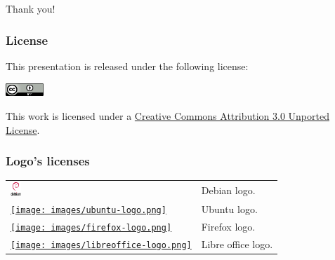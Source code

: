 \documentclass[slidestop,compress,mathserif]{beamer}
\begin{document}
\section{}
\begin{frame}
  \vspace*{\fill}
  \begin{center}
    {\Huge Thank you!}
  \end{center}
  \vspace*{\fill}
\end{frame}

\begin{frame}
  \frametitle{License}
  This presentation is released under the following license:
  
  \begin{block}{}
    \begin{center}
      \includegraphics[height=0.5cm]{images/cc-by.png}
  
      This work is licensed under a \href{http://creativecommons.org/licenses/by/3.0/deed.en_US}{Creative Commons Attribution 3.0 Unported License}.
    \end{center}
  \end{block}
\end{frame}

\begin{frame}
  \frametitle{Logo's licenses}
  \begin{tabularx}{\textwidth}{lX}
    \href{http://www.debian.org/logos/openlogo-100.png}{\includegraphics[height=0.5cm]{images/debian-logo.png}} & Debian logo. \\
    \href{http://design.ubuntu.com/wp-content/uploads/logo-ubuntu_cof-orange-hex.png}{\texttt{[image: images/ubuntu-logo.png]}} & Ubuntu logo. \\
    \href{http://upload.wikimedia.org/wikipedia/commons/e/e7/Mozilla_Firefox_3.5_logo_256.png}{\texttt{[image: images/firefox-logo.png]}} & Firefox logo. \\
    \href{http://upload.wikimedia.org/wikipedia/commons/thumb/c/cb/LibreOfficelogo.svg/200px-LibreOfficelogo.svg.png}{\texttt{[image: images/libreoffice-logo.png]}} & Libre office logo. \\
  \end{tabularx}
\end{frame}
\end{document}
